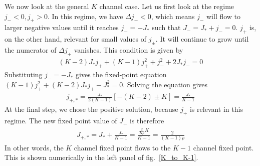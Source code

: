 \documentclass[reprint,prb,superscriptaddress]{revtex4-2}
\begin{document}
We now look at the general \(K\) channel case. Let us first look at the regime \(j_- < 0, j_+ > 0\). In this regime, we have \(\Delta j_- < 0\), which means \(j_-\) will flow to larger negative values until it reaches \(j_- = -J_*\) such that \(J_- = J_* + j_- = 0\). \(j_+\) is, on the other hand, relevant for small values of \(j_\pm\). It will continue to grow until the numerator of \(\Delta j_+\) vanishes. This condition is given by
\begin{align}
	\left(K - 2\right)J_*j_+ + (K-1)j_+^2 + j_-^2 + 2J_* j_- = 0
\end{align}
Substituting \(j_- = -J_*\) gives the fixed-point equation \((K-1)j_+^2 + \left(K - 2\right)J_*j_+ - J_*^2 = 0\). Solving the equation gives
\begin{align}
	j_{+,*} = \frac{J_*}{2(K-1)}\left[-(K-2) \pm K\right] = \frac{J_*}{K-1}
\end{align}
At the final step, we chose the positive solution, because \(j_+\) is relevant in this regime. The new fixed point value of \(J_+\) is therefore
\begin{align}
	J_{+,*} = J_* + \frac{J_*}{K-1} = \frac{\frac{2}{K \rho} K}{K - 1} = \frac{2}{(K-1)\rho}
\end{align}
In other words, the \(K\) channel fixed point flows to the \(K-1\) channel fixed point. This is shown numerically in the left panel of fig.~\ref{K_to_K-1}.
\end{document}
